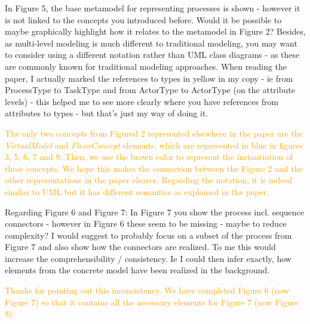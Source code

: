 \documentclass[10pt]{article}
\begin{document}
\begin{response}{In Figure 5, the base metamodel for representing processes is shown - however it is not linked to the concepts you introduced before. Would it be possible to maybe graphically highlight how it relates to the metamodel in Figure 2? Besides, as multi-level modeling is much different to traditional modeling, you may want to consider using a different notation rather than UML class diagrams - as these are commonly known for traditional modeling approaches. When reading the paper, I actually marked the references to types in yellow in my copy - ie from ProcessType to TaskType and from ActorType to ActorType (on the attribute levels) - this helped me to see more clearly where you have references from attributes to types - but that's just my way of doing it.} 

\textcolor{orange}{The only two concepts from Figured 2 represented elsewhere in the paper are the \emph{VirtualModel} and \emph{FlexoConcept} elements, which are represented in blue in figures 3, 5, 6, 7 and 9. Then, we use the brown color to represent the instantiation of these concepts. We hope this makes the connection between the Figure 2 and the other representations in the paper clearer. Regarding the notation, it is indeed similar to UML but it has different semantics as explained in the paper.}



\end{response}

\begin{response}{Regarding Figure 6 and Figure 7: In Figure 7 you show the process incl. sequence connectors - however in Figure 6 these seem to be missing - maybe to reduce complexity? I would suggest to probably focus on a subset of the process from Figure 7 and also show how the connectors are realized. To me this would increase the comprehensibility / consistency. Ie I could then infer exactly, how elements from the concrete model have been realized in the background.} 

\textcolor{orange}{Thanks for pointing out this inconsistency. We have completed Figure 6 (now Figure 7) so that it contains all the necessary elements for Figure 7 (now Figure 8).} 


\end{response}
\end{document}
